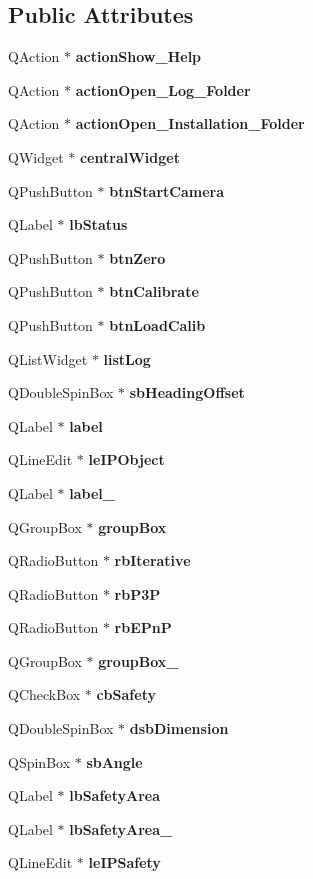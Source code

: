 \subsection*{Public Attributes}
\begin{DoxyCompactItemize}
\item 
Q\+Action $\ast$ \textbf{ action\+Show\+\_\+\+Help}
\item 
Q\+Action $\ast$ \textbf{ action\+Open\+\_\+\+Log\+\_\+\+Folder}
\item 
Q\+Action $\ast$ \textbf{ action\+Open\+\_\+\+Installation\+\_\+\+Folder}
\item 
Q\+Widget $\ast$ \textbf{ central\+Widget}
\item 
Q\+Push\+Button $\ast$ \textbf{ btn\+Start\+Camera}
\item 
Q\+Label $\ast$ \textbf{ lb\+Status}
\item 
Q\+Push\+Button $\ast$ \textbf{ btn\+Zero}
\item 
Q\+Push\+Button $\ast$ \textbf{ btn\+Calibrate}
\item 
Q\+Push\+Button $\ast$ \textbf{ btn\+Load\+Calib}
\item 
Q\+List\+Widget $\ast$ \textbf{ list\+Log}
\item 
Q\+Double\+Spin\+Box $\ast$ \textbf{ sb\+Heading\+Offset}
\item 
Q\+Label $\ast$ \textbf{ label}
\item 
Q\+Line\+Edit $\ast$ \textbf{ le\+I\+P\+Object}
\item 
Q\+Label $\ast$ \textbf{ label\+\_}
\item 
Q\+Group\+Box $\ast$ \textbf{ group\+Box}
\item 
Q\+Radio\+Button $\ast$ \textbf{ rb\+Iterative}
\item 
Q\+Radio\+Button $\ast$ \textbf{ rb\+P3P}
\item 
Q\+Radio\+Button $\ast$ \textbf{ rb\+E\+PnP}
\item 
Q\+Group\+Box $\ast$ \textbf{ group\+Box\+\_}
\item 
Q\+Check\+Box $\ast$ \textbf{ cb\+Safety}
\item 
Q\+Double\+Spin\+Box $\ast$ \textbf{ dsb\+Dimension}
\item 
Q\+Spin\+Box $\ast$ \textbf{ sb\+Angle}
\item 
Q\+Label $\ast$ \textbf{ lb\+Safety\+Area}
\item 
Q\+Label $\ast$ \textbf{ lb\+Safety\+Area\+\_}
\item 
Q\+Line\+Edit $\ast$ \textbf{ le\+I\+P\+Safety}

\end{DoxyCompactItemize}
